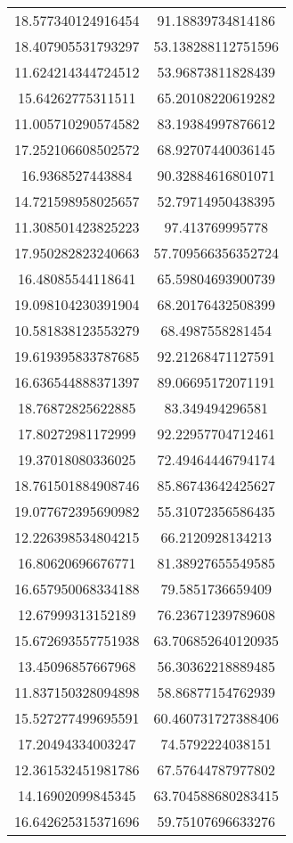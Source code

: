 \begin{table}
\begin{tabular}{cc}
18.577340124916454 & 91.18839734814186 \\
18.407905531793297 & 53.138288112751596 \\
11.624214344724512 & 53.96873811828439 \\
15.64262775311511 & 65.20108220619282 \\
11.005710290574582 & 83.19384997876612 \\
17.252106608502572 & 68.92707440036145 \\
16.9368527443884 & 90.32884616801071 \\
14.721598958025657 & 52.79714950438395 \\
11.308501423825223 & 97.413769995778 \\
17.950282823240663 & 57.709566356352724 \\
16.48085544118641 & 65.59804693900739 \\
19.098104230391904 & 68.20176432508399 \\
10.581838123553279 & 68.4987558281454 \\
19.619395833787685 & 92.21268471127591 \\
16.636544888371397 & 89.06695172071191 \\
18.76872825622885 & 83.349494296581 \\
17.80272981172999 & 92.22957704712461 \\
19.37018080336025 & 72.49464446794174 \\
18.761501884908746 & 85.86743642425627 \\
19.077672395690982 & 55.31072356586435 \\
12.226398534804215 & 66.2120928134213 \\
16.80620696676771 & 81.38927655549585 \\
16.657950068334188 & 79.5851736659409 \\
12.67999313152189 & 76.23671239789608 \\
15.672693557751938 & 63.706852640120935 \\
13.45096857667968 & 56.30362218889485 \\
11.837150328094898 & 58.86877154762939 \\
15.527277499695591 & 60.460731727388406 \\
17.20494334003247 & 74.5792224038151 \\
12.361532451981786 & 67.57644787977802 \\
14.16902099845345 & 63.704588680283415 \\
16.642625315371696 & 59.75107696633276 \\

\end{tabular}
\end{table}
